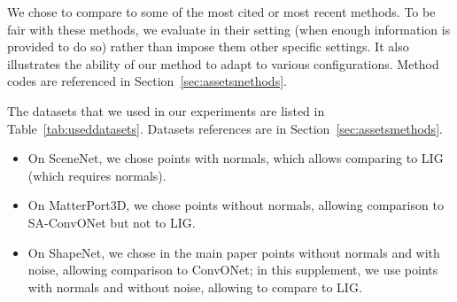 \documentclass[10pt,twocolumn,letterpaper]{article}
\begin{document}
We chose to compare to some of the most cited or most recent methods. To be fair with these methods, we evaluate in their setting (when enough information is provided to do so) rather than impose them other specific settings. It also illustrates the ability of our method to adapt to various configurations. Method codes are referenced in Section~\ref{sec:assetsmethods}.

The datasets that we used in our experiments are listed in Table~\ref{tab:useddatasets}.  Datasets references are in Section~\ref{sec:assetsmethods}.
\begin{itemize}[nosep]
    \item On SceneNet, we chose points with normals, which allows comparing to LIG (which requires normals).
    \item On MatterPort3D, we chose points without normals, allowing comparison to SA-ConvONet but not to LIG.
    \item On ShapeNet, we chose in the main paper points without normals and with noise, allowing comparison to ConvONet; in this supplement, we use points with normals and without noise, allowing to compare to LIG.
\end{itemize}
\end{document}
